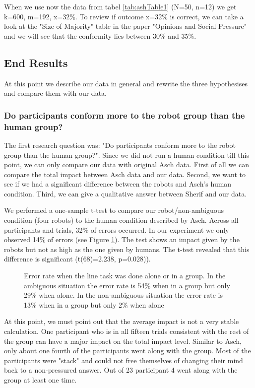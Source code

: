 \documentclass{acm_proc_article-sp}
\begin{document}
When we use now the data from tabel \ref{tab:ashTable1} (N=50, n=12) we get k=600, m=192, x=32\%. To review if outcome x=32\% is correct, we can take a look at the "Size of Majority" table in the paper "Opinions and Social Pressure" and we will see that the conformity lies between 30\% and 35\%.  


\subsection{End Results}
At this point we describe our data in general and rewrite the three hypothesises and compare them with our data. 

\subsubsection{Do participants conform more to the robot group than the human group?}
The first research question was: "Do participants conform more to the robot group than the human group?". Since we did not run a human condition till this point, we can only compare our data with original Asch data. First of all we can compare the total impact between Asch data and our data. Second, we want to see if we had a significant difference between the robots and Asch's human condition. Third, we can give a qualitative answer between Sherif and our data.

We performed a one-sample t-test to compare our robot/non-ambiguous condition (four robots) to the human condition described by Asch. Across all participants and trials, 32\% of errors occurred. In our experiment we only observed 14\% of errors (see Figure \ref{fig:lineabig1}). The test shows an impact given by the robots but not as high as the one given by humans. The t-test revealed that this difference is significant (t(68)=2.238, p=0.028)).

\begin{figure}
\centering
{}
\caption{Error rate when the line task was done alone or in a group. In the ambiguous situation the error rate is 54\% when in a group but only 29\% when alone. In the non-ambiguous situation the error rate is 13\% when in a group but only 2\% when alone}
\label{fig:lineabig1}
\end{figure}

At this point, we must point out that the average impact is not a very stable calculation. One participant who is in all fifteen trials consistent with the rest of the group can have a major impact on the total impact level. Similar to Asch, only about one fourth of the participants went along with the group. Most of the participants were "stack" and could not free themselves of changing their mind back to a non-pressured answer. Out of 23 participant 4 went along with the group at least one time.  
\end{document}

